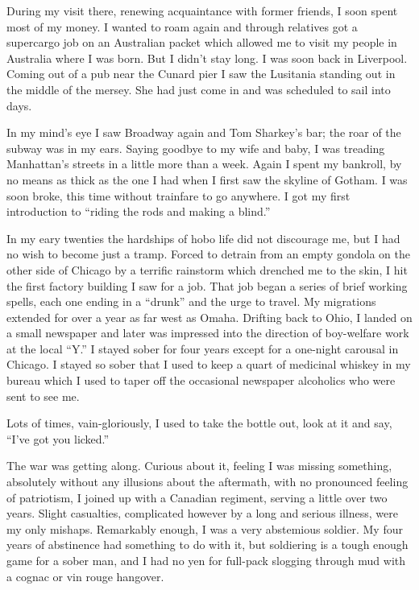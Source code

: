 \begin{biblechapter}
During my visit there, renewing acquaintance with former friends, I soon spent most of my money. I wanted to roam again and through relatives got a supercargo job on an Australian packet which allowed me to visit my people in Australia where I was born. But I didn’t stay long. I was soon back in Liverpool. Coming out of a pub near the Cunard pier I saw the Lusitania standing out in the middle of the mersey. She had just come in and was scheduled to sail into days.

In my mind’s eye I saw Broadway again and Tom Sharkey’s bar; the roar of the subway was in my ears. Saying goodbye to my wife and baby, I was treading Manhattan’s streets in a little more than a week. Again I spent my bankroll, by no means as thick as the one I had when I first saw the skyline of Gotham. I was soon broke, this time without trainfare to go anywhere. I got my first introduction to “riding the rods and making a blind.”

      In my eary twenties the hardships of hobo life did not discourage me, but I had no wish to become just a tramp. Forced to detrain from an empty gondola on the other side of Chicago by a terrific rainstorm which drenched me to the skin, I hit the first factory building I saw for a job. That job began a series of brief working spells, each one ending in a “drunk” and the urge to travel. My migrations extended for over a year as far west as Omaha. Drifting back to Ohio, I landed on a small newspaper and later was impressed into the direction of boy-welfare work at the local “Y.” I stayed sober for four years except for a one-night carousal in Chicago. I stayed so sober that I used to keep a quart of medicinal whiskey in my bureau which I used to taper off the occasional newspaper alcoholics who were sent to see me.

Lots of times, vain-gloriously, I used to take the bottle out, look at it and say, “I’ve got you licked.”

The war was getting along. Curious about it, feeling I was missing something, absolutely without any illusions about the aftermath, with no pronounced feeling of patriotism, I joined up with a Canadian regiment, serving a little over two years. Slight casualties, complicated however by a long and serious illness, were my only mishaps. Remarkably enough, I was a very abstemious soldier. My four years of abstinence had something to do with it, but soldiering is a tough enough game for a sober man, and I had no yen for full-pack slogging through mud with a cognac or vin rouge hangover.


\end{biblechapter}
